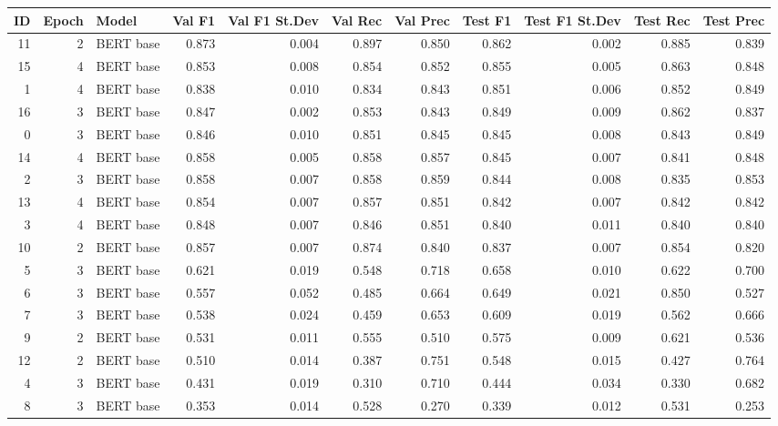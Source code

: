 \begin{tabular}{rrlrrrrrrrr}
\toprule
 ID &  Epoch &     Model &  Val F1 &  Val F1 St.Dev &  Val Rec &  Val Prec &  Test F1 &  Test F1 St.Dev &  Test Rec &  Test Prec \\
\midrule
 11 &      2 & BERT base &   0.873 &          0.004 &    0.897 &     0.850 &    0.862 &           0.002 &     0.885 &      0.839 \\
 15 &      4 & BERT base &   0.853 &          0.008 &    0.854 &     0.852 &    0.855 &           0.005 &     0.863 &      0.848 \\
  1 &      4 & BERT base &   0.838 &          0.010 &    0.834 &     0.843 &    0.851 &           0.006 &     0.852 &      0.849 \\
 16 &      3 & BERT base &   0.847 &          0.002 &    0.853 &     0.843 &    0.849 &           0.009 &     0.862 &      0.837 \\
  0 &      3 & BERT base &   0.846 &          0.010 &    0.851 &     0.845 &    0.845 &           0.008 &     0.843 &      0.849 \\
 14 &      4 & BERT base &   0.858 &          0.005 &    0.858 &     0.857 &    0.845 &           0.007 &     0.841 &      0.848 \\
  2 &      3 & BERT base &   0.858 &          0.007 &    0.858 &     0.859 &    0.844 &           0.008 &     0.835 &      0.853 \\
 13 &      4 & BERT base &   0.854 &          0.007 &    0.857 &     0.851 &    0.842 &           0.007 &     0.842 &      0.842 \\
  3 &      4 & BERT base &   0.848 &          0.007 &    0.846 &     0.851 &    0.840 &           0.011 &     0.840 &      0.840 \\
 10 &      2 & BERT base &   0.857 &          0.007 &    0.874 &     0.840 &    0.837 &           0.007 &     0.854 &      0.820 \\
  5 &      3 & BERT base &   0.621 &          0.019 &    0.548 &     0.718 &    0.658 &           0.010 &     0.622 &      0.700 \\
  6 &      3 & BERT base &   0.557 &          0.052 &    0.485 &     0.664 &    0.649 &           0.021 &     0.850 &      0.527 \\
  7 &      3 & BERT base &   0.538 &          0.024 &    0.459 &     0.653 &    0.609 &           0.019 &     0.562 &      0.666 \\
  9 &      2 & BERT base &   0.531 &          0.011 &    0.555 &     0.510 &    0.575 &           0.009 &     0.621 &      0.536 \\
 12 &      2 & BERT base &   0.510 &          0.014 &    0.387 &     0.751 &    0.548 &           0.015 &     0.427 &      0.764 \\
  4 &      3 & BERT base &   0.431 &          0.019 &    0.310 &     0.710 &    0.444 &           0.034 &     0.330 &      0.682 \\
  8 &      3 & BERT base &   0.353 &          0.014 &    0.528 &     0.270 &    0.339 &           0.012 &     0.531 &      0.253 \\
\bottomrule
\end{tabular}

